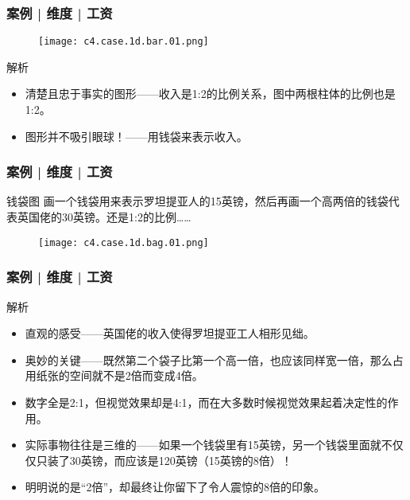 \begin{frame}
  \frametitle{案例 | 维度 | 工资}
  \begin{figure}
    \centering
    \texttt{[image: c4.case.1d.bar.01.png]}
  \end{figure}
  \vspace{-1em}
  \begin{block}{解析}
    \begin{itemize}
      \item 清楚且忠于事实的图形——收入是1:2的比例关系，图中两根柱体的比例也是1:2。
      \item 图形并不吸引眼球！——用钱袋来表示收入。
    \end{itemize}
  \end{block}
\end{frame}

\begin{frame}
  \frametitle{案例 | 维度 | 工资}
  \begin{block}{钱袋图}
    画一个钱袋用来表示罗坦提亚人的15英镑，然后再画一个高两倍的钱袋代表英国佬的30英镑。还是1:2的比例……
  \end{block}
  \vspace{-0.5em}
  \begin{figure}
    \centering
    \texttt{[image: c4.case.1d.bag.01.png]}
  \end{figure}
\end{frame}

\begin{frame}
  \frametitle{案例 | 维度 | 工资}
  \begin{block}{解析}
    \begin{itemize}
      \item 直观的感受——英国佬的收入使得罗坦提亚工人相形见绌。
      \item 奥妙的关键——既然第二个袋子比第一个高一倍，也应该同样宽一倍，那么占用纸张的空间就不是2倍而变成4倍。
      \item 数字全是2:1，但视觉效果却是4:1，而在大多数时候视觉效果起着决定性的作用。
      \item 实际事物往往是三维的——如果一个钱袋里有15英镑，另一个钱袋里面就不仅仅只装了30英镑，而应该是120英镑（15英镑的8倍）！
      \item 明明说的是“2倍”，却最终让你留下了令人震惊的8倍的印象。
    \end{itemize}
  \end{block}
\end{frame}

